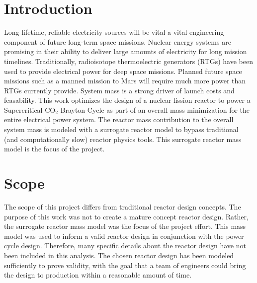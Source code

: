 \section{Introduction}
Long-lifetime, reliable electricity sources will be vital a vital engineering
component of future long-term space missions. Nuclear energy systems are
promising in their ability to deliver large amounts of electricity for long
mission timelines. Traditionally, radioisotope thermoelectric generators (RTGs)
have been used to provide electrical power for deep space missions. Planned
future space missions such as a manned mission to Mars will require much more
power than RTGs currently provide. System mass is a strong driver of launch
costs and feasability. This work optimizes the design of a nuclear
fission reactor to power a Supercritical CO$_2$ Brayton Cycle as part of an
overall mass minimization for the entire electrical power system. The reactor
mass contribution to the overall system mass is modeled with a surrogate reactor
model to bypass traditional (and computationally slow) reactor physics tools.
This surrogate reactor mass model is the focus of the project.

\section{Scope}
The scope of this project differs from traditional reactor design concepts. The
purpose of this work was not to create a mature concept reactor design. Rather,
the surrogate reactor mass model was the focus of the project effort. This mass
model was used to inform a valid reactor design in conjunction with the power
cycle design. Therefore, many specific details about the reactor design have not
been included in this analysis. The chosen reactor design has been modeled
sufficiently to prove validity, with the goal that a team of engineers could
bring the design to production within a reasonable amount of time.
